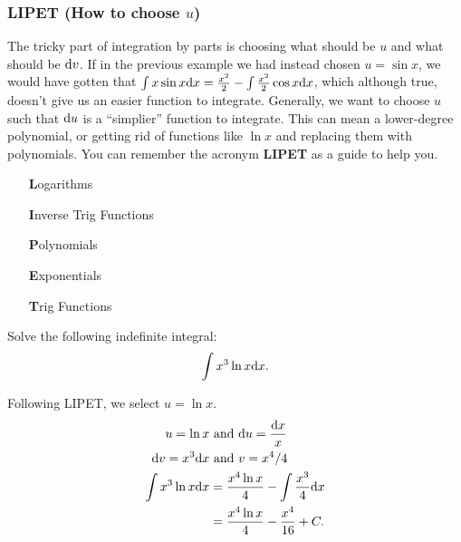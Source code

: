 \subsubsection{LIPET (How to choose $u$)}
The tricky part of integration by parts is choosing what should be $u$ and what should be $\mathrm{d} v$.
If in the previous example we had instead chosen $u=\sin{x}$, we would have gotten that $\int{x\sin{x}\mathrm{d} x} = \frac{x^2}{2}-\int{\frac{x^2}{2}\cos{x}\mathrm{d} x}$, which although true, doesn't give us an easier function to integrate.
Generally, we want to choose $u$ such that $\mathrm{d} u$ is a ``simplier'' function to integrate.
This can mean a lower-degree polynomial, or getting rid of functions like $\ln{x}$ and replacing them with polynomials.
You can remember the acronym \textbf{LIPET} as a guide to help you.
\begin{itemize}[align=left, leftmargin=0.66in]
	\item[\textbf{L}ogarithms]
	\item[\textbf{I}nverse Trig Functions]
	\item[\textbf{P}olynomials]
	\item[\textbf{E}xponentials]
	\item[\textbf{T}rig Functions]
\end{itemize}

\begin{example}
	Solve the following indefinite integral:
	\begin{equation*}
		\int{x^3\ln{x}\mathrm{d} x}.
	\end{equation*}
\end{example}
\begin{answer}
	Following LIPET, we select $u = \ln{x}$.
	\begin{align*}
		u = \ln{x} &\text{ and } \mathrm{d} u = \frac{\mathrm{d} x}{x} \\
		\mathrm{d} v = x^3\mathrm{d} x &\text{ and } v = x^4/4 \\
		\int{x^3\ln{x}\mathrm{d} x} &= \frac{x^4\ln{x}}{4} - \int{\frac{x^3}{4}\mathrm{d} x} \\
		&= \frac{x^4\ln{x}}{4} - \frac{x^4}{16} + C.
	\end{align*}
\end{answer}


